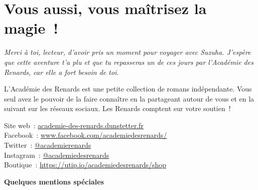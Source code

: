 \chapter*{Vous aussi, vous maîtrisez la magie~!}

\textit{Merci à toi, lecteur, d'avoir pris un moment pour voyager avec Suzuha. J'espère que cette aventure t'a plu et que tu repasseras un de ces jours par l'Académie des Renards, car elle a fort besoin de toi.} 

\parbr

L'Académie des Renards est une petite collection de romans indépendante. Vous seul avez le pouvoir de la faire connaître en la partageant autour de vous et en la suivant sur les réseaux sociaux. Les Renards comptent sur votre soutien~!

\parbr

Site web~: \href{http://academie-des-renards.dunstetter.fr}{academie-des-renards.dunstetter.fr} \\

Facebook~: \href{https://www.facebook.com/academiedesrenards/}{www.facebook.com/academiedesrenards/} \\

Twitter~: \href{https://twitter.com/academierenards}{@academierenards} \\

Instagram~:  \href{https://www.instagram.com/academiedesrenards/}{@academiedesrenards} \\

Boutique~: \href{https://utip.io/academiedesrenards/shop}{https://utip.io/academiedesrenards/shop}

\newpage

\textbf{Quelques mentions spéciales}

